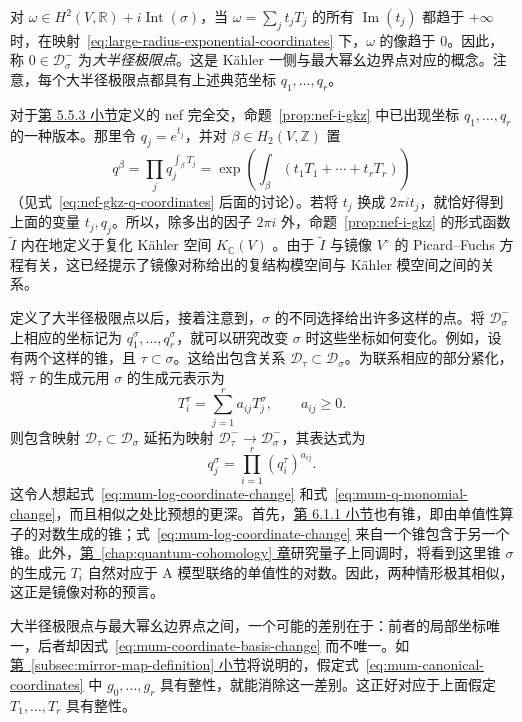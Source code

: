 对 $\omega\in H^2(V,\mathbb R)+i\operatorname{Int}(\sigma)$，当 $\omega=\sum_jt_jT_j$ 的所有 $\operatorname{Im}(t_j)$ 都趋于 $+\infty$ 时，在映射~\eqref{eq:large-radius-exponential-coordinates} 下，$\omega$ 的像趋于 $0$。因此，称 $0\in\mathcal D_\sigma^-$ 为\emph{大半径极限点}。这是 Kähler 一侧与最大幂幺边界点对应的概念。注意，每个大半径极限点都具有上述典范坐标 $q_1,\ldots,q_r$。

对于\hyperref[subsec:nef-gkz]{第 5.5.3 小节}定义的 nef 完全交，命题~\ref{prop:nef-i-gkz} 中已出现坐标 $q_1,\ldots,q_r$ 的一种版本。那里令 $q_j=e^{t_j}$，并对 $\beta\in H_2(V,\mathbb Z)$ 置
\[
q^\beta=\prod_jq_j^{\int_\beta T_j}
=\exp\left(\int_\beta(t_1T_1+\cdots+t_rT_r)\right)
\]
（见式~\eqref{eq:nef-gkz-q-coordinates} 后面的讨论）。若将 $t_j$ 换成 $2\pi i t_j$，就恰好得到上面的变量 $t_j,q_j$。所以，除多出的因子 $2\pi i$ 外，命题~\ref{prop:nef-i-gkz} 的形式函数 $\widetilde I$ 内在地定义于复化 Kähler 空间 $K_{\mathbb C}(V)$ 。由于 $\widetilde I$ 与镜像 $V^\circ$ 的 Picard--Fuchs 方程有关，这已经提示了镜像对称给出的复结构模空间与 Kähler 模空间之间的关系。

定义了大半径极限点以后，接着注意到，$\sigma$ 的不同选择给出许多这样的点。将 $\mathcal D_\sigma^-$ 上相应的坐标记为 $q_1^\sigma,\ldots,q_r^\sigma$，就可以研究改变 $\sigma$ 时这些坐标如何变化。例如，设有两个这样的锥，且 $\tau\subset\sigma$。这给出包含关系 $\mathcal D_\tau\subset\mathcal D_\sigma$。为联系相应的部分紧化，将 $\tau$ 的生成元用 $\sigma$ 的生成元表示为
\[
T_i^\tau=\sum_{j=1}^r a_{ij}T_j^\sigma,\qquad a_{ij}\geq0.
\]
则包含映射 $\mathcal D_\tau\subset\mathcal D_\sigma$ 延拓为映射 $\mathcal D_\tau^-\to\mathcal D_\sigma^-$，其表达式为
\[
q_j^\sigma=\prod_{i=1}^r(q_i^\tau)^{a_{ij}}.
\]
这令人想起式~\eqref{eq:mum-log-coordinate-change} 和式~\eqref{eq:mum-q-monomial-change}，而且相似之处比预想的更深。首先，\hyperref[subsec:mum-boundary-points]{第 6.1.1 小节}也有锥，即由单值性算子的对数生成的锥；式~\eqref{eq:mum-log-coordinate-change} 来自一个锥包含于另一个锥。此外，\hyperref[chap:quantum-cohomology]{第~\ref*{chap:quantum-cohomology} 章}研究量子上同调时，将看到这里锥 $\sigma$ 的生成元 $T_i$ 自然对应于 A 模型联络的单值性的对数。因此，两种情形极其相似，这正是镜像对称的预言。

大半径极限点与最大幂幺边界点之间，一个可能的差别在于：前者的局部坐标唯一，后者却因式~\eqref{eq:mum-coordinate-basis-change} 而不唯一。如\hyperref[subsec:mirror-map-definition]{第~\ref*{subsec:mirror-map-definition} 小节}将说明的，假定式~\eqref{eq:mum-canonical-coordinates} 中 $g_0,\ldots,g_r$ 具有整性，就能消除这一差别。这正好对应于上面假定 $T_1,\ldots,T_r$ 具有整性。


